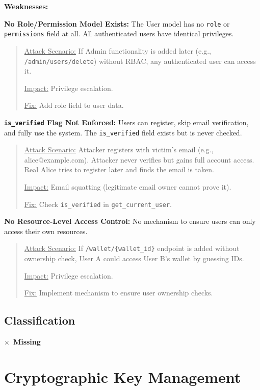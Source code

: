 \documentclass[11pt,a4paper]{article}
\newcommand{\missing}{\textcolor{dangerred}{$\times$~\textbf{Missing}}}
\begin{document}
\textbf{Weaknesses:}

\textbf{No Role/Permission Model Exists:} The User model has no \texttt{role} or \texttt{permissions} field at all. All authenticated users have identical privileges.

\begin{quote}
\underline{Attack Scenario:} If Admin functionality is added later (e.g., \texttt{/admin/users/delete}) without RBAC, any authenticated user can access it.

\underline{Impact:} Privilege escalation.

\underline{Fix:} Add role field to user data.
\end{quote}

\textbf{\texttt{is\_verified} Flag Not Enforced:} Users can register, skip email verification, and fully use the system. The \texttt{is\_verified} field exists but is never checked.

\begin{quote}
\underline{Attack Scenario:} Attacker registers with victim's email (e.g., alice@example.com). Attacker never verifies but gains full account access. Real Alice tries to register later and finds the email is taken.

\underline{Impact:} Email squatting (legitimate email owner cannot prove it).

\underline{Fix:} Check \texttt{is\_verified} in \texttt{get\_current\_user}.
\end{quote}

\textbf{No Resource-Level Access Control:} No mechanism to ensure users can only access their own resources.

\begin{quote}
\underline{Attack Scenario:} If \texttt{/wallet/\{wallet\_id\}} endpoint is added without ownership check, User A could access User B's wallet by guessing IDs.

\underline{Impact:} Privilege escalation.

\underline{Fix:} Implement mechanism to ensure user ownership checks.
\end{quote}

\subsection{Classification}
\missing

\newpage
\section{Cryptographic Key Management}
\end{document}
